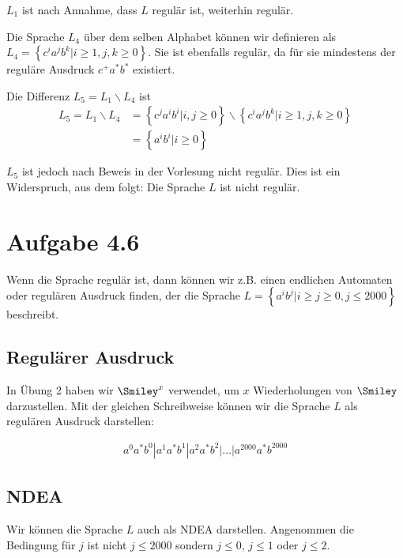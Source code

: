 \documentclass{article}
\begin{document}
$L_1$ ist nach Annahme, dass $L$ regulär ist, weiterhin regulär. 

\vspace{1em}

Die Sprache $L_4$ über dem selben Alphabet können wir definieren als $L_4 = \left\{c^ia^jb^k | i \geq 1, j, k \geq 0 \right\}$. Sie ist ebenfalls regulär, da für sie mindestens der reguläre Ausdruck $c^+a^*b^*$ existiert.

Die Differenz $L_5 = L_1 \backslash L_4$ ist
\begin{align*}
L_5 = L_1 \backslash L_4 &= \left\{c^ja^ib^i | i,j \geq 0 \right\} \backslash \left\{c^ia^jb^k | i \geq 1, j, k \geq 0 \right\} \\
                         &= \left\{a^ib^i | i \geq 0 \right\}
\end{align*}

$L_5$ ist jedoch nach Beweis in der Vorlesung nicht regulär. Dies ist ein Widerspruch, aus dem folgt: Die Sprache $L$ ist nicht regulär.



\section*{Aufgabe 4.6}
Wenn die Sprache regulär ist, dann können wir z.B. einen endlichen Automaten oder regulären Ausdruck finden, der die Sprache $L = \left\{a^ib^j | i \geq j \geq 0, j \leq 2000 \right\}$ beschreibt.

\subsection*{Regulärer Ausdruck}
\begin{samepage}
In Übung 2 haben wir $\Smiley^x$ verwendet, um $x$ Wiederholungen von $\Smiley$ darzustellen. Mit der gleichen Schreibweise können wir die Sprache $L$ als regulären Ausdruck darstellen:

\begin{align*}
a^0a^*b^0|a^1a^*b^1|a^2a^*b^2|...|a^{2000}a^*b^{2000}
\end{align*}
\end{samepage}

\subsection*{NDEA}
Wir können die Sprache $L$ auch als NDEA darstellen. Angenommen die Bedingung für $j$ ist nicht $j \leq 2000$ sondern $j \leq 0$, $j\leq 1$ oder $j \leq 2$.
\end{document}
